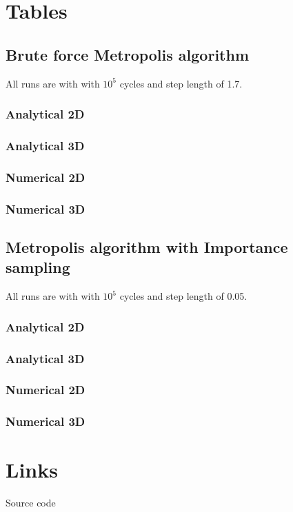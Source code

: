 \section{Tables}
\subsection{Brute force Metropolis algorithm}
All runs are with with $10^5$ cycles and step length
of 1.7.
%
\subsubsection{Analytical 2D}

\subsubsection{Analytical 3D}

%
\subsubsection{Numerical 2D}

\subsubsection{Numerical 3D}

\subsection{Metropolis algorithm with Importance sampling}
All runs are with with $10^5$ cycles and step length
of 0.05.
%
\subsubsection{Analytical 2D}

\subsubsection{Analytical 3D}

%
\subsubsection{Numerical 2D}

\subsubsection{Numerical 3D}

\section{Links}
Source code\cite{git}
